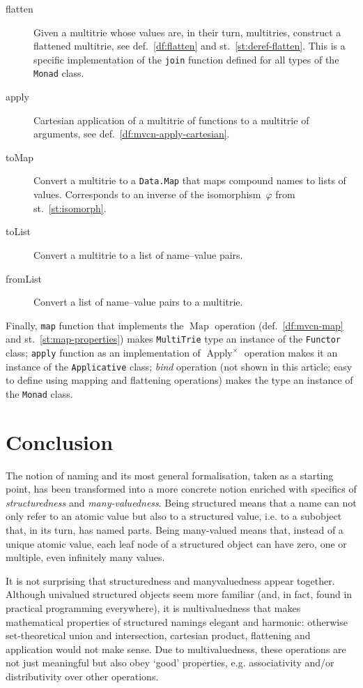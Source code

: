 \documentclass{article}
\theoremstyle{definition}
\newcommand{\fmap}{\operatorname{Map}}
\newcommand{\apply}{\operatorname{Apply}}
\begin{document}
\begin{description}
\item [flatten]
  Given a multitrie whose values are, in their turn, multitries, construct
  a flattened multitrie, see def.~\ref{df:flatten} and
  st.~\ref{st:deref-flatten}. This is a specific implementation of the
  \lstinline{join} function defined for all types of the \lstinline{Monad}
  class.
\item [apply]
  Cartesian
  application of a multitrie of functions to a multitrie of arguments, see
  def.~\ref{df:mvcn-apply-cartesian}.
\item [toMap]
  Convert a multitrie to a \lstinline{Data.Map} that maps compound names to
  lists of values. Corresponds to an inverse of the isomorphism~$\varphi$
  from st.~\ref{st:isomorph}.
\item [toList]
  Convert a multitrie to a list of name--value pairs.
\item [fromList]
  Convert a list of name--value pairs to a multitrie.
\end{description}

Finally, \lstinline{map} function that implements the $\fmap$ operation
(def.~\ref{df:mvcn-map} and st.~\ref{st:map-properties})
makes \lstinline{MultiTrie} type an instance of the \lstinline{Functor} class; 
\lstinline{apply} function as an implementation of $\apply^{\times}$
operation makes it an instance of the \lstinline{Applicative} class; 
\emph{bind} operation (not shown in this article; easy to define using mapping
and flattening operations) makes the type an instance of the
\lstinline{Monad} class.



\section{Conclusion}

The notion of naming and its most general formalisation, taken as a starting
point, has been transformed into a more concrete notion enriched with specifics of
\emph{structuredness} and \emph{many-valuedness}. Being structured
means that a name can not only refer to an atomic value but also
to a structured value, i.e. to a subobject that, in its turn, has named parts.
Being many-valued means that, instead of a unique atomic value, each leaf node
of a structured object can have zero, one or multiple, even infinitely many
values.

It is not surprising that structuredness and manyvaluedness appear together.
Although univalued structured objects seem more familiar (and, in fact, found
in practical programming everywhere), it is multivaluedness that makes
mathematical properties of structured namings elegant and harmonic: otherwise
set-theoretical union and intersection, cartesian product, flattening and
application would not make sense. Due to multivaluedness, these operations are
not just meaningful but also obey `good' properties, e.g.  associativity and/or
distributivity over other operations.
\end{document}

